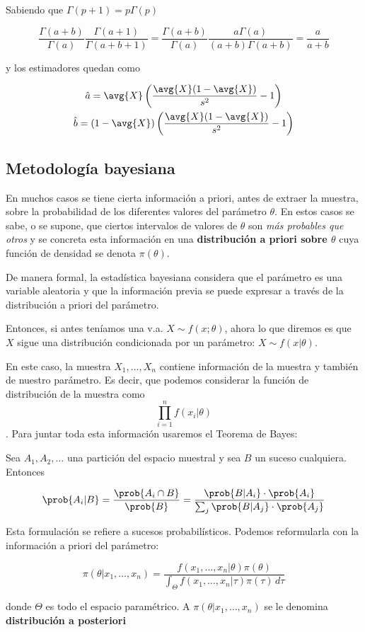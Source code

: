 \documentclass{apuntes}
\begin{document}
Sabiendo que $\Gamma(p+1) = p\Gamma(p)$

\[ \frac{\Gamma(a+b)}{\Gamma(a)}\frac{\Gamma(a+1)}{\Gamma(a+b+1)} = 
	\frac{\Gamma(a+b)}{\Gamma(a)}\frac{a\Gamma(a)}{(a+b)\Gamma(a+b)} = \frac{a}{a+b} \]
	
y los estimadores quedan como
	
\begin{gather*}
\hat{a} = \avg{X}\left(\frac{\avg{X}(1-\avg{X})}{s^2}-1\right) \\
\hat{b} = (1-\avg{X})\left(\frac{\avg{X}(1-\avg{X})}{s^2}-1\right) 
\end{gather*}

\subsection{Metodología bayesiana}

En muchos casos se tiene cierta información a priori, antes de extraer la muestra, sobre la probabilidad de los diferentes valores del parámetro $\theta$. En estos casos se sabe, o se supone, que ciertos intervalos de valores de $\theta$ son \textit{más probables que otros} y se concreta esta información en una \textbf{distribución a priori sobre $\theta$} cuya función de densidad se denota $\pi(\theta)$.

De manera formal, la estadística bayesiana considera que el parámetro es una variable aleatoria y que la información previa se puede expresar a través de la distribución a priori del parámetro.

Entonces, si antes teníamos una v.a. $X\sim f(x;\theta)$, ahora lo que diremos es que $X$ sigue una distribución condicionada por un parámetro: $X\sim f(x|\theta)$.

En este caso, la muestra $X_1,\dotsc,X_n$ contiene información de la muestra y también de nuestro parámetro. Es decir, que podemos considerar la función de distribución de la muestra como \[ \prod_{i=1}^n f(x_i|\theta) \]. Para juntar toda esta información usaremos el Teorema de Bayes:

\begin{theorem} Sea $A_1,A_2,\dotsc$ una partición del espacio muestral y sea $B$ un suceso cualquiera. Entonces

\[ \prob{A_i|B} = \frac{\prob{A_i\cap B}}{\prob{B}} = \frac{\prob{B|A_i}\cdot \prob{A_i}}{\sum_j \prob{B|A_j}\cdot \prob{A_j}} \]

Esta formulación se refiere a sucesos probabilísticos. Podemos reformularla con la información a priori del parámetro:

\begin{equation}
\label{eqBayes}
 \pi(\theta | x_1,\dotsc,x_n) = \frac{f(x_1,\dotsc,x_n|\theta)\pi(\theta)}{\displaystyle \int_\Theta f(x_1,\dotsc,x_n|\tau)\pi(\tau)\,d\tau} 
 \end{equation}

donde $\Theta$ es todo el espacio paramétrico. A $ \pi(\theta | x_1,\dotsc,x_n) $ se le denomina \textbf{distribución a posteriori}
\end{theorem}
\end{document}
